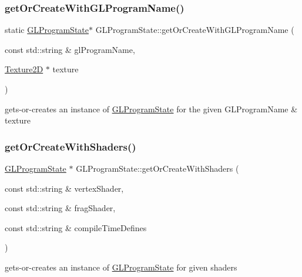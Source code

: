 \subsubsection{\texorpdfstring{get\+Or\+Create\+With\+G\+L\+Program\+Name()}{getOrCreateWithGLProgramName()}\hspace{0.1cm}{\footnotesize\ttfamily [4/4]}}
{\footnotesize\ttfamily static \hyperlink{classGLProgramState}{G\+L\+Program\+State}$\ast$ G\+L\+Program\+State\+::get\+Or\+Create\+With\+G\+L\+Program\+Name (\begin{DoxyParamCaption}\item[{const std\+::string \&}]{gl\+Program\+Name,  }\item[{\hyperlink{classTexture2D}{Texture2D} $\ast$}]{texture }\end{DoxyParamCaption})\hspace{0.3cm}{\ttfamily [static]}}

gets-\/or-\/creates an instance of \hyperlink{classGLProgramState}{G\+L\+Program\+State} for the given G\+L\+Program\+Name \& texture \mbox{\label{classGLProgramState_a2354b8a559b9869ebc4d4973ffd7d68d}} 
\subsubsection{\texorpdfstring{get\+Or\+Create\+With\+Shaders()}{getOrCreateWithShaders()}\hspace{0.1cm}{\footnotesize\ttfamily [1/2]}}
{\footnotesize\ttfamily \hyperlink{classGLProgramState}{G\+L\+Program\+State} $\ast$ G\+L\+Program\+State\+::get\+Or\+Create\+With\+Shaders (\begin{DoxyParamCaption}\item[{const std\+::string \&}]{vertex\+Shader,  }\item[{const std\+::string \&}]{frag\+Shader,  }\item[{const std\+::string \&}]{compile\+Time\+Defines }\end{DoxyParamCaption})\hspace{0.3cm}{\ttfamily [static]}}

gets-\/or-\/creates an instance of \hyperlink{classGLProgramState}{G\+L\+Program\+State} for given shaders \mbox{\label{classGLProgramState_a76ea99c645e5a65c97e04bbeeb3b0341}} 
